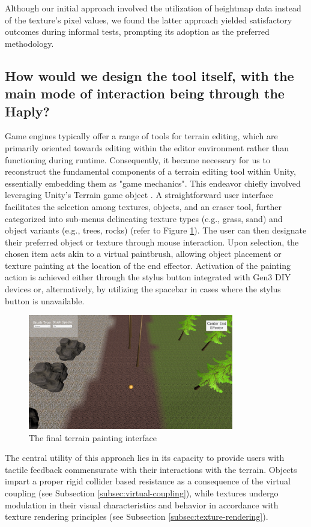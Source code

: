 Although our initial approach involved the utilization of heightmap data instead of the texture's pixel values, we found the latter approach yielded satisfactory outcomes during informal tests, prompting its adoption as the preferred methodology.

\subsection{How would we design the tool itself, with the main mode of interaction being through the Haply?} \label{subsec:terrain-painting}

Game engines typically offer a range of tools for terrain editing, which are primarily oriented towards editing within the editor environment rather than functioning during runtime. Consequently, it became necessary for us to reconstruct the fundamental components of a terrain editing tool within Unity, essentially embedding them as "game mechanics". This endeavor chiefly involved leveraging Unity's Terrain game object \cite{unityterrain}. A straightforward user interface facilitates the selection among textures, objects, and an eraser tool, further categorized into sub-menus delineating texture types (e.g., grass, sand) and object variants (e.g., trees, rocks) (refer to Figure \ref{fig:terrain-painting}). The user can then designate their preferred object or texture through mouse interaction. Upon selection, the chosen item acts akin to a virtual paintbrush, allowing object placement or texture painting at the location of the end effector. Activation of the painting action is achieved either through the stylus button integrated with Gen3 DIY devices or, alternatively, by utilizing the spacebar in cases where the stylus button is unavailable.

\begin{figure}[htbp]
    \centering
    \includegraphics[width=0.8\textwidth]{images/approach-terrain-painter.png} 
    \caption{The final terrain painting interface}
    \label{fig:terrain-painting}
\end{figure}

The central utility of this approach lies in its capacity to provide users with tactile feedback commensurate with their interactions with the terrain. Objects impart a proper rigid collider based resistance as a consequence of the virtual coupling (see Subsection \ref{subsec:virtual-coupling}), while textures undergo modulation in their visual characteristics and behavior in accordance with texture rendering principles (see Subsection \ref{subsec:texture-rendering}).
